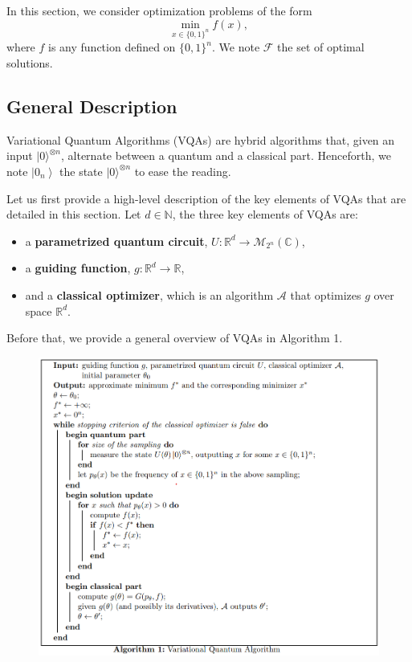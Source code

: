 In this section, we consider optimization problems of the form
\begin{equation}
    \min _{x \in\{0,1\}^{n}} f(x), \tag{1}
\end{equation}
where $f$ is any function defined on $\{0,1\}^{n}$. We note $\mathcal{F}$ the set of optimal solutions.

\subsection{General Description}

Variational Quantum Algorithms (VQAs) are hybrid algorithms that, given an input $|0\rangle^{\otimes n}$, alternate between a quantum and a classical part. Henceforth, we note $\left|0_{n}\right\rangle$ the state $|0\rangle^{\otimes n}$ to ease the reading. 

Let us first provide a high-level description of the key elements of VQAs that are detailed in this section. Let $d \in \mathbb{N}$, the three key elements of VQAs are:
\begin{itemize}
    \item a \textbf{parametrized quantum circuit}, $U: \mathbb{R}^{d} \rightarrow \mathcal{M}_{2^{n}}(\mathbb{C})$,
    \item a \textbf{guiding function}, $g: \mathbb{R}^{d} \rightarrow \mathbb{R}$,
    \item and a \textbf{classical optimizer}, which is an algorithm $\mathcal{A}$ that optimizes $g$ over space $\mathbb{R}^{d}$.
\end{itemize}
Before that, we provide a general overview of VQAs in Algorithm 1. 
\begin{figure}[ht]
    \centering
    \includegraphics[width=1\linewidth]{Images/VQA-algorithm.png}
\end{figure}


